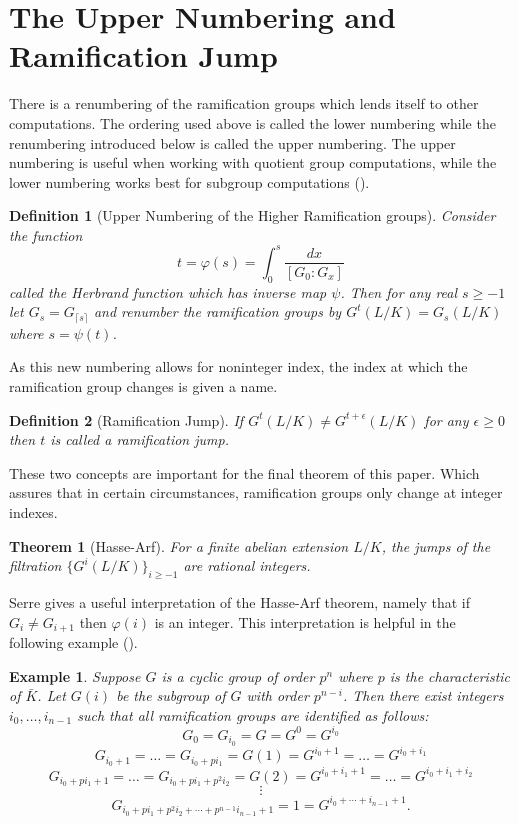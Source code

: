 \documentclass[paper=a4, fontsize=11pt]{scrartcl} %
\numberwithin{equation}{section} %
\numberwithin{figure}{section} %
\numberwithin{table}{section} %
\theoremstyle{break}
\newtheorem{defn}{Definition}
\newtheorem{thm}{Theorem}
\newtheorem{ex}{Example}
\begin{document}
\section{The Upper Numbering and Ramification Jump}
There is a renumbering of the ramification groups which lends itself to other computations. The ordering used above is called the lower numbering while the renumbering introduced below is called the upper numbering. The upper numbering is useful when working with quotient group computations, while the lower numbering works best for subgroup computations (\cite{Neukirch}).
\begin{defn}[Upper Numbering of the Higher Ramification groups]
Consider the function
$$
t = \varphi(s) = \int_{0}^{s} \frac{dx}{[G_0 : G_x]}
$$
called the Herbrand function which has inverse map $\psi$.
Then for any real $s \geq -1$ let $G_s = G_{\lceil s \rceil}$ and renumber the ramification groups by $G^t(L/K) = G_s(L/K)$ where $s=\psi(t)$. 
\end{defn}
As this new numbering allows for noninteger index, the index at which the ramification group changes is given a name.
\begin{defn}[Ramification Jump]
If $G^{t}(L/K) \not=G^{t+\epsilon}(L/K)$ for any $\epsilon \geq 0$ then $t$ is called a ramification jump.
\end{defn}
These two concepts are important for the final theorem of this paper. Which assures that in certain circumstances, ramification groups only change at integer indexes.
\begin{thm}[Hasse-Arf]
For a finite abelian extension $L/K$, the jumps of the filtration $\{G^{i}(L/K)\}_{i \geq -1}$ are rational integers.
\end{thm}
Serre gives a useful interpretation of the Hasse-Arf theorem, namely that if $G_i \not= G_{i+1}$ then $\varphi(i)$ is an integer. This interpretation is helpful in the following example (\cite{Serre}).

\begin{ex}
Suppose $G$ is a cyclic group of order $p^n$ where $p$ is the characteristic of $\bar{K}$. Let $G(i)$ be the subgroup of $G$ with order $p^{n-i}$. Then there exist integers $i_0, \ldots,i_{n-1}$ such that all ramification groups are identified as follows:
$$G_0 = G_{i_0} = G = G^0 = G^{i_0}$$
$$G_{{i_0}+1} = \ldots = G_{{i_0}+pi_1} = G(1) = G^{i_0+1} = \ldots = G^{i_0 + i_1}$$
$$G_{{i_0}+pi_1+1} = \ldots = G_{{i_0}+pi_1+p^2 i_2} = G(2) = G^{i_0+i_1+1} = \ldots = G^{i_0 + i_1+i_2}$$
$$\vdots$$
$$G_{i_0+pi_1+p^2 i_2 + \cdots + p^{n-1}i_{n-1} +1}={1}=G^{i_0+\cdots+i_{n-1}+1}.$$
\end{ex}
\end{document}
